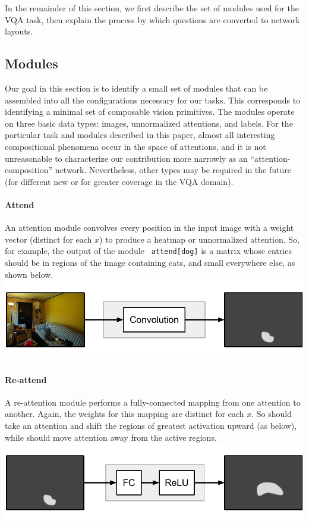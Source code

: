 \documentclass[10pt,twocolumn,letterpaper]{article}
\begin{document}
In the remainder of this section, we first describe the set of modules used for
the VQA task, then explain the process by which questions are converted to
network layouts.

\subsection{Modules}

Our goal in this section is to identify a small set of modules that can be
assembled into all the configurations necessary for our tasks. This corresponds
to identifying a minimal set of composable vision primitives. The modules
operate on three basic data types: images, unnormalized attentions, and labels.
For the particular task and modules described in this paper, almost all
interesting compositional phenomena occur in the space of attentions, and it is
not unreasonable to characterize our contribution more narrowly as an
``attention-composition'' network. Nevertheless, other types may be
required in the future (for different new or for greater coverage in the VQA
domain).

\pagebreak
\paragraph{Attend}

An attention module  convolves every position in the input
image with a weight vector (distinct for each $x$) to produce a heatmap or
unnormalized attention. So, for example, the output of the module {\small\tt
attend[dog]} is a matrix whose entries should be in regions of the image
containing cats, and small everywhere else, as shown below.\\
\includegraphics[width=\columnwidth]{fig/attend}

\paragraph{Re-attend}

A re-attention module  performs a fully-connected mapping
from one attention to another. Again, the weights for this mapping are distinct
for each $x$. So  should take an attention and shift the
regions of greatest activation upward (as below), while 
should move attention away from the active regions.\\%
\includegraphics[width=\columnwidth]{fig/re-attend}
\end{document}
